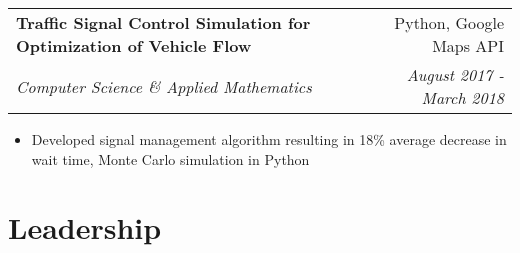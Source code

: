 \documentclass[letterpaper,11pt]{article}
\makeatletter
\newcommand{\resitem}[1]{\item[--] #1 \vspace{-8pt}}
\newcommand{\ressubheading}[4]{
	\vspace{6pt}
	\begin{tabular*}{7.5in}{l@{\extracolsep{\fill}}r}
			\textbf{#1} & #2 \\
			\textit{#3} & \textit{#4}
	\end{tabular*}
	\vspace{-12pt}
}
\makeatother
\begin{document}
		\ressubheading{Traffic Signal Control Simulation for Optimization of Vehicle Flow}{Python, Google Maps API}{Computer Science \& Applied Mathematics}{August 2017 - March 2018}
			\begin{itemize}[leftmargin=*]
				\resitem{Developed signal management algorithm resulting in 18\% average decrease in wait time, Monte Carlo simulation in Python}
			\end{itemize}




\section{Leadership}
\end{document}
